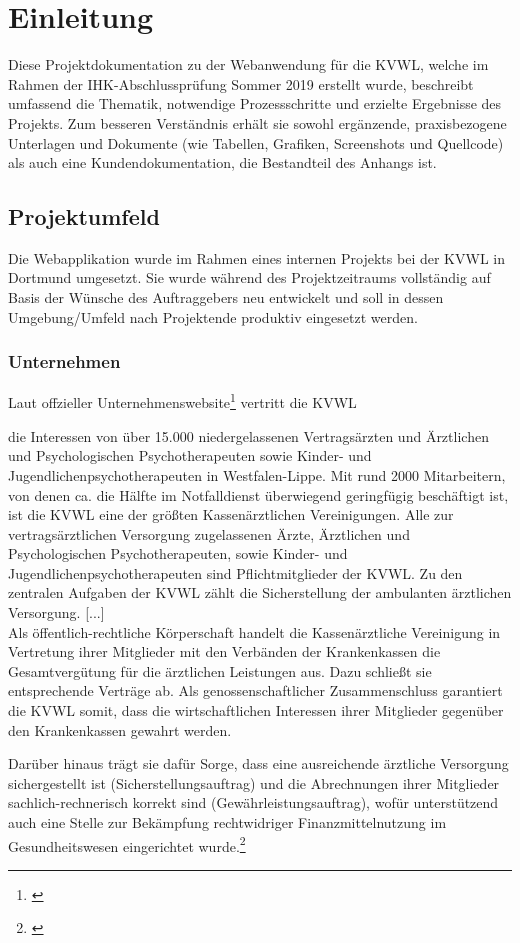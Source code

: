 \section{Einleitung}
\label{sec:Einleitung}
Diese Projektdokumentation zu der Webanwendung \projektName für die \ac{KVWL}, welche im Rahmen der IHK-Abschlussprüfung Sommer 2019 erstellt wurde, beschreibt umfassend \ua die Thematik, notwendige Prozessschritte und erzielte Ergebnisse des Projekts. Zum besseren Verständnis erhält sie sowohl ergänzende, praxisbezogene Unterlagen und Dokumente (wie Tabellen, Grafiken, Screenshots und Quellcode) als auch eine Kundendokumentation, die Bestandteil des Anhangs ist.

\subsection{Projektumfeld} 
\label{sec:Projektumfeld}
Die Webapplikation wurde im Rahmen eines internen Projekts bei der \ac{KVWL} in Dortmund umgesetzt. Sie wurde während des Projektzeitraums vollständig auf Basis der Wünsche des Auftraggebers neu entwickelt und soll in dessen Umgebung/Umfeld nach Projektende produktiv eingesetzt werden.

\subsubsection{Unternehmen} 
\label{sec:Unternehmen}
Laut offzieller Unternehmenswebsite\footnote{\cite{KVWL}} vertritt die \ac{KVWL}
\begin{displayquote}
	die Interessen von über 15.000 niedergelassenen Vertragsärzten und Ärztlichen und Psychologischen Psychotherapeuten sowie Kinder- und Jugendlichenpsychotherapeuten in Westfalen-Lippe. Mit rund 2000 Mitarbeitern, von denen ca. die Hälfte im Notfalldienst überwiegend geringfügig beschäftigt ist, ist die \ac{KVWL} eine der größten Kassenärztlichen Vereinigungen. Alle zur vertragsärztlichen Versorgung zugelassenen Ärzte, Ärztlichen und Psychologischen Psychotherapeuten, sowie Kinder- und Jugendlichenpsychotherapeuten sind Pflichtmitglieder der \ac{KVWL}. Zu den zentralen Aufgaben der \ac{KVWL} zählt die Sicherstellung der ambulanten ärztlichen Versorgung. [...]\\
	Als öffentlich-rechtliche Körperschaft handelt die Kassenärztliche Vereinigung in Vertretung ihrer Mitglieder mit den Verbänden der Krankenkassen die Gesamtvergütung für die ärztlichen Leistungen aus. Dazu schließt sie entsprechende Verträge ab. Als genossenschaftlicher Zusammenschluss garantiert die \ac{KVWL} somit, dass die wirtschaftlichen Interessen ihrer Mitglieder gegenüber den Krankenkassen gewahrt werden.
\end{displayquote}
Darüber hinaus trägt sie dafür Sorge, dass eine ausreichende ärztliche Versorgung sichergestellt ist (Sicherstellungsauftrag) und die Abrechnungen ihrer Mitglieder sachlich-rechnerisch korrekt sind (Gewährleistungsauftrag), wofür unterstützend auch eine Stelle zur Bekämpfung rechtwidriger Finanzmittelnutzung im Gesundheitswesen eingerichtet wurde.\footnote{\Vgl \cite{KVWL}}

